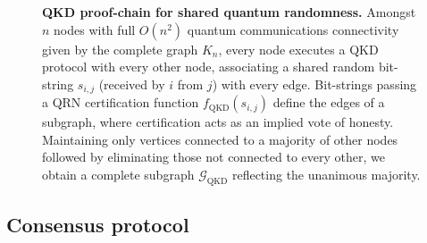 

\begin{figure}[!htb]
	
	\caption{\textbf{QKD proof-chain for shared quantum randomness.} Amongst $n$ nodes with full $O(n^2)$ quantum communications connectivity given by the complete graph $K_n$, every node executes a QKD protocol with every other node, associating a shared random bit-string $s_{i,j}$ (received by $i$ from $j$) with every edge. Bit-strings passing a QRN certification function $f_\mathrm{QKD}(s_{i,j})$ define the edges of a subgraph, where certification acts as an implied vote of honesty. Maintaining only vertices connected to a majority of other nodes followed by eliminating those not connected to every other, we obtain a complete subgraph $\mathcal{G}_\mathrm{QKD}$ reflecting the unanimous majority.} \label{fig:proof_chains_QKD}
\end{figure}

\subsection{Consensus protocol} \label{sec:QRNG_consensus_protocol}

